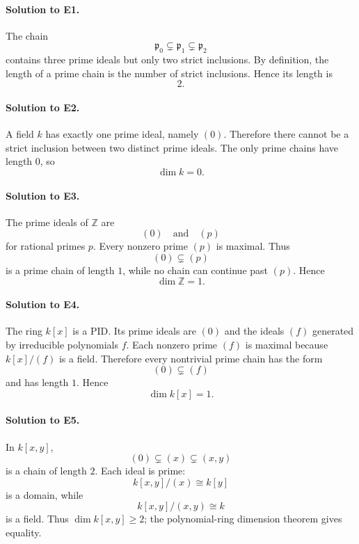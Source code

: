 
\paragraph{Solution to E1.}
The chain
\[
\mathfrak p_0\subsetneq\mathfrak p_1\subsetneq\mathfrak p_2
\]
contains three prime ideals but only two strict inclusions.  By definition, the length of a prime
chain is the number of strict inclusions.  Hence its length is
\[
\boxed{2}.
\]

\paragraph{Solution to E2.}
A field \(k\) has exactly one prime ideal, namely \((0)\).  Therefore there cannot be a strict
inclusion between two distinct prime ideals.  The only prime chains have length \(0\), so
\[
\boxed{\dim k=0}.
\]

\paragraph{Solution to E3.}
The prime ideals of \(\mathbb Z\) are
\[
(0)\quad\text{and}\quad(p)
\]
for rational primes \(p\).  Every nonzero prime \((p)\) is maximal.  Thus
\[
(0)\subsetneq(p)
\]
is a prime chain of length \(1\), while no chain can continue past \((p)\).  Hence
\[
\boxed{\dim\mathbb Z=1}.
\]

\paragraph{Solution to E4.}
The ring \(k[x]\) is a PID.  Its prime ideals are \((0)\) and the ideals \((f)\) generated by
irreducible polynomials \(f\).  Each nonzero prime \((f)\) is maximal because
\(k[x]/(f)\) is a field.  Therefore every nontrivial prime chain has the form
\[
(0)\subsetneq(f)
\]
and has length \(1\).  Hence
\[
\boxed{\dim k[x]=1}.
\]

\paragraph{Solution to E5.}
In \(k[x,y]\),
\[
(0)\subsetneq(x)\subsetneq(x,y)
\]
is a chain of length \(2\).  Each ideal is prime:
\[
k[x,y]/(x)\cong k[y]
\]
is a domain, while
\[
k[x,y]/(x,y)\cong k
\]
is a field.  Thus \(\dim k[x,y]\ge2\); the polynomial-ring dimension theorem gives equality.

